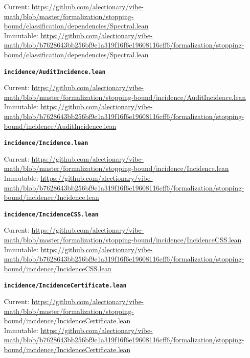 {\footnotesize\noindent Current: \url{https://github.com/alectionary/vibe-math/blob/master/formalization/stopping-bound/classification/dependencies/Spectral.lean}\\
Immutable: \url{https://github.com/alectionary/vibe-math/blob/b7628643bb256bf9c1a319f16f6e19608116cff6/formalization/stopping-bound/classification/dependencies/Spectral.lean}\par}
\smallskip
\medskip
\par\noindent\textbf{\texttt{incidence/AuditIncidence.lean}}\par\nopagebreak
{\footnotesize\noindent Current: \url{https://github.com/alectionary/vibe-math/blob/master/formalization/stopping-bound/incidence/AuditIncidence.lean}\\
Immutable: \url{https://github.com/alectionary/vibe-math/blob/b7628643bb256bf9c1a319f16f6e19608116cff6/formalization/stopping-bound/incidence/AuditIncidence.lean}\par}
\smallskip
\medskip
\par\noindent\textbf{\texttt{incidence/Incidence.lean}}\par\nopagebreak
{\footnotesize\noindent Current: \url{https://github.com/alectionary/vibe-math/blob/master/formalization/stopping-bound/incidence/Incidence.lean}\\
Immutable: \url{https://github.com/alectionary/vibe-math/blob/b7628643bb256bf9c1a319f16f6e19608116cff6/formalization/stopping-bound/incidence/Incidence.lean}\par}
\smallskip
\medskip
\par\noindent\textbf{\texttt{incidence/IncidenceCSS.lean}}\par\nopagebreak
{\footnotesize\noindent Current: \url{https://github.com/alectionary/vibe-math/blob/master/formalization/stopping-bound/incidence/IncidenceCSS.lean}\\
Immutable: \url{https://github.com/alectionary/vibe-math/blob/b7628643bb256bf9c1a319f16f6e19608116cff6/formalization/stopping-bound/incidence/IncidenceCSS.lean}\par}
\smallskip
\medskip
\par\noindent\textbf{\texttt{incidence/IncidenceCertificate.lean}}\par\nopagebreak
{\footnotesize\noindent Current: \url{https://github.com/alectionary/vibe-math/blob/master/formalization/stopping-bound/incidence/IncidenceCertificate.lean}\\
Immutable: \url{https://github.com/alectionary/vibe-math/blob/b7628643bb256bf9c1a319f16f6e19608116cff6/formalization/stopping-bound/incidence/IncidenceCertificate.lean}\par}
